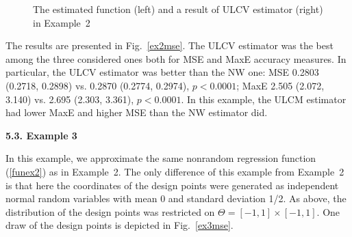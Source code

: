\documentclass[12pt]{article}
\theoremstyle{remark}
\begin{document}
\begin{figure}[!h]
    \centering
    \vspace{-12pt}
    \caption{The estimated function (left) and a result of ULCV estimator (right) in Example~2}\label{ex2fun}
\end{figure}


The results are presented in Fig.~\ref{ex2mse}. The ULCV estimator was the best among the three considered ones both for MSE and MaxE accuracy measures. In particular, the ULCV estimator was better than the NW one: MSE 0.2803 (0.2718,  0.2898) vs.
0.2870  (0.2774,  0.2974), $p<0.0001$; MaxE 2.505  (2.072, 3.140) vs.
2.695 (2.303, 3.361), $p<0.0001$.
In this example, the ULCM estimator had lower MaxE and higher MSE than the NW estimator did.

\bigskip

\newpage
\noindent\textbf{5.3. Example 3}


In this example, we approximate the same nonrandom regression function
(\ref{funex2}) as in Example~2. The only difference of this example from Example~2 is that here
the coordinates of the design points were generated as independent normal random variables with mean 0 and standard deviation 1/2.
As above, the distribution of the design points was restricted on
$\Theta = [-1,1]\times [-1,1]$.
One draw of the design points is depicted in Fig.~\ref{ex3mse}.
\end{document}
